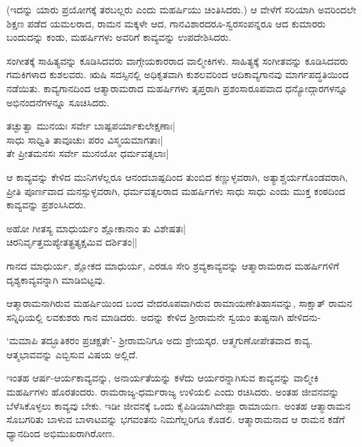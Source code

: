 (ಇದನ್ನು ಯಾರು ಪ್ರಯೋಗಕ್ಕೆ ತರಬಲ್ಲರು ಎಂದು ಮಹರ್ಷಿಯು ಚಿಂತಿಸಿದರು.) ಆ ವೇಳೆಗೆ ಸರಿಯಾಗಿ ಅವರಿಂದಲೇ ಶಿಕ್ಷಣ ಪಡೆದ ಯಮಲರಾದ, ರಾಮನ ಮಕ್ಕಳೇ ಆದ, ಗಾನವಿಶಾರದರೂ-ಸ್ವರಸಂಪನ್ನರೂ ಆದ ಕುಮಾರರು ಬಂದುದನ್ನು ಕಂಡು, ಮಹರ್ಷಿಗಳು ಅವರಿಗೆ ಕಾವ್ಯವನ್ನು ಉಪದೇಶಿಸಿದರು. 

ಸಂಗೀತಕ್ಕೆ ಸಾಹಿತ್ಯವನ್ನು ಕೂಡಿಸಿದವರು ವಾಗ್ಗೇಯಕಾರರಾದ ವಾಲ್ಮೀಕಿಗಳು. ಸಾಹಿತ್ಯಕ್ಕೆ ಸಂಗೀತವನ್ನು ಕೂಡಿಸಿದವರು ಗಮಕಿಗಳಾದ ಕುಶಲವರು. ಋಷಿ ಸದಸ್ಸಿನಲ್ಲಿ ಅಧಿಕೃತವಾಗಿ ಕುಶಲವರಿಂದ ಆದಿಕಾವ್ಯಗಾನವು ಮಾರ್ಗಪದ್ಧತಿಯಿಂದ ನಡೆಯಿತು. ಕಾವ್ಯಗಾನದಿಂದ ಆತ್ಮಾರಾಮರಾದ ಮಹರ್ಷಿಗಳು ತೃಪ್ತರಾಗಿ ಪ್ರಶಂಸಾರೂಪವಾದ ಧನ್ಯೋದ್ಗಾರಗಳನ್ನೂ ಅಭಿನಂದನೆಗಳನ್ನೂ ಸೂಚಿಸಿದರು. 

\begin{shloka} 
ತಚ್ಘುತ್ವಾ ಮುನಯಃ ಸರ್ವೇ ಬಾಷ್ಪಪರ್ಯಾಕುಲೇಕ್ಷಣಾಃ|\label{158}\\ 
ಸಾಧು ಸಾಧ್ವಿತಿ ತಾವೂಚುಃ ಪರಂ ವಿಸ್ಮಯಮಾಗತಾಃ|\\ 
ತೇ ಪ್ರೀತಮನಸಃ ಸರ್ವೇ ಮುನಯೋ ಧರ್ಮವತ್ಸಲಾಃ|
\end{shloka} 

ಆ ಕಾವ್ಯವನ್ನು ಕೇಳಿದ ಮುನಿಗಳೆಲ್ಲರೂ ಆನಂದಬಾಷ್ಪದಿಂದ ತುಂಬಿದ ಕಣ್ಣುಳ್ಳವರಾಗಿ, ಅತ್ಯಾಶ್ಚರ್ಯಗೊಂಡವರಾಗಿ, ಪ್ರೀತಿ ಪೂರ್ಣವಾದ ಮನಸ್ಸುಳ್ಳವರಾಗಿ, ಧರ್ಮವತ್ಸಲರಾದ ಮಹರ್ಷಿಗಳು ಸಾಧು ಸಾಧು ಎಂದು ಮುಕ್ತ ಕಂಠದಿಂದ ಕಾವ್ಯವನ್ನು ಪ್ರಶಂಸಿಸಿದರು. 

\begin{shloka} 
ಅಹೋ ಗೀತಸ್ಯ ಮಾಧುರ್ಯಂ ಶ್ಲೋಕಾನಾಂ ತು ವಿಶೇಷತಃ|\label{159}\\ 
ಚಿರನಿರ್ವೃತ್ತಮಪ್ಯೇತತ್ಪ್ರತ್ಯಕ್ಷಮಿವ ದರ್ಶಿತಂ||
\end{shloka} 

ಗಾನದ ಮಾಧುರ್ಯ, ಶ್ಲೋಕದ ಮಾಧುರ್ಯ, ಎರಡೂ ಸೇರಿ ಶ್ರವ್ಯಕಾವ್ಯವನ್ನು ಆತ್ಮಾರಾಮರಾದ ಮಹರ್ಷಿಗಳಿಗೆ ದೃಶ್ಯಕಾವ್ಯವನ್ನಾಗಿ ಮಾಡಿಬಿಟ್ಟವು. 

ಆತ್ಮಾರಾಮನಾಗಿರುವ ಮಹರ್ಷಿಯಿಂದ ಬಂದ ವೇದರೂಪವಾಗಿರುವ ರಾಮಾಯಣೇತಿಹಾಸವನ್ನು, ಸಾಕ್ಷಾತ್‍ ರಾಮನ ಸನ್ನಿಧಿಯಲ್ಲಿ ಲವಕುಶರು ಗಾನ ಮಾಡಿದರು. ಅದನ್ನು ಕೇಳಿದ ಶ್ರೀರಾಮನೇ ಸ್ವಯಂ ತುಷ್ಟನಾಗಿ ಹೇಳಿದನು- 

`ಮಮಾಪಿ ತದ್ಭೂತಿಕರಂ ಪ್ರಚಕ್ಷತೇ'- ಶ್ರೀರಾಮನಿಗೂ ಅದು ಶ್ರೇಯಸ್ಕರ. ಆತ್ಮಗುಣೋಪೇತವಾದ ಕಾವ್ಯ. ಆತ್ಮಭಾವವನ್ನು ಎಬ್ಬಿಸುವ ವಿಷಯ ಅಲ್ಲಿದೆ. 

ಇಂತಹ ಆರ್ಷ-ಆರ್ಯಕಾವ್ಯವನ್ನು, ಅನಾರ್ಯತೆಯನ್ನು ಕಳೆದು ಆರ್ಯರನ್ನಾಗಿಸುವ ಕಾವ್ಯವನ್ನು ವಾಲ್ಮೀಕಿ ಮಹರ್ಷಿಗಳು ಹೊರತಂದರು. ರಾಮರಾಜ್ಯ-ಧರ್ಮರಾಜ್ಯ ಉಳಿಯಲಿ ಎಂದು ರಚಿಸಿದರು. ಅಂತಹ ಜೀವನವನ್ನು ಬೆಳೆಸಿಕೊಳ್ಳಲು ಕಾವ್ಯವು ಬೇಕು. ಇಡೀ ಜೀವನಕ್ಕೆ ಒಂದು ಕೈಪಿಡಿಯಾಗಿದೇಪ್ಪಾ ರಾಮಾಯಣ. ಅಂತಹ ಆತ್ಮಾರಾಮನ ಸೊಬಗರಿತು ಬಾಳುವ ಬಾಳಾಟವನ್ನು ಭಗವಂತನು ನಿಮಗೆಲ್ಲರಿಗೂ ಕೊಡಲಿ. ಆತ್ಮಾರಾಮನಾದ ಆ ರಾಮನ ಕಡೆಗೆ ಧ್ಯಾನದಿಂದ ಅಭಿಮುಖರಾಗಿರೋಣ. 
